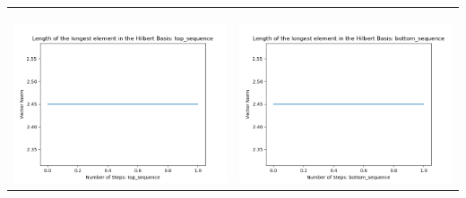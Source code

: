 \documentclass[10pt]{article}
\begin{document}
\begin{tabular}{c|c}
\begin{minipage}{.45\textwidth}
\end{minipage} \\ \\
\hline \\\begin{minipage}{.45\textwidth}
\includegraphics[width=\textwidth]{"DATA/5d/6 generators 1 bound J/top_sequence LENGTH"}
\end{minipage} &
\begin{minipage}{.45\textwidth}
\includegraphics[width=\textwidth]{"DATA/5d/6 generators 1 bound J bottomup/bottom_sequence LENGTH"}
\end{minipage}
\end{tabular}
\end{document}
